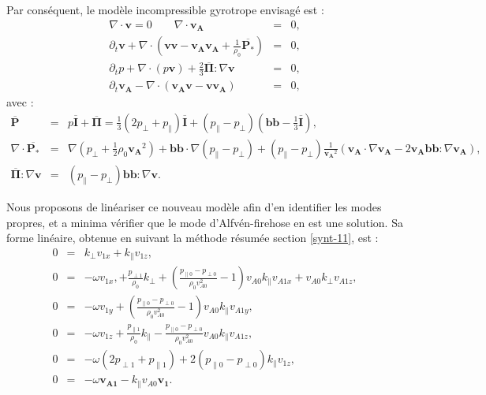 Par conséquent, le modèle incompressible gyrotrope envisagé est : 
\begin{eqnarray}
\label{eq:model_cpginc_r} \nabla \cdot \boldsymbol{v} = 0  \qquad \nabla \cdot \boldsymbol{v_A} &=& 0,\\
\label{eq:model_cpginc_v} \partial_t  \boldsymbol{v} + \nabla \cdot (\boldsymbol{v}\boldsymbol{v} - \boldsymbol{v_A}\boldsymbol{v_A} + \frac{1}{\rho_0} \overline{\boldsymbol{P_*}})  &=& 0 , \\
\label{eq:model_cpginc_p} \partial_t p + \nabla \cdot (p \boldsymbol{v} ) + \frac{2}{3} \overline{\boldsymbol{\Pi}} : \nabla \boldsymbol{v}   &=& 0  , \\
\label{eq:model_cpginc_b} \partial_t \boldsymbol{v_A} -  \nabla \cdot (\boldsymbol{v_A}\boldsymbol{v} - \boldsymbol{v}\boldsymbol{v_A}) &=& 0 ,
\end{eqnarray}
avec :
\begin{eqnarray*} 
\overline{\boldsymbol{P}} &=& p \overline{\boldsymbol{I}} +  \overline{\boldsymbol{\Pi}} =\frac{1}{3} (2 p_{\perp} + p_{\parallel} )\overline{\boldsymbol{I}} + (p_{\parallel} - p_{\perp})(\boldsymbol{b}\boldsymbol{b} - \frac{1}{3} \overline{\boldsymbol{I}} ) ,\\
 \nabla \cdot \overline{\boldsymbol{P_*}} &=& \nabla (p_{\perp}+\frac{1}{2} \rho_0\boldsymbol{v_A}^2) + \boldsymbol{b}\boldsymbol{b} \cdot \nabla (p_{\parallel}-p_{\perp}) + (p_{\parallel}-p_{\perp})\frac{1}{\boldsymbol{v_A}^2} (\boldsymbol{v_A} \cdot \nabla \boldsymbol{v_A} - 2 \boldsymbol{v_A}\boldsymbol{b}\boldsymbol{b}:\nabla \boldsymbol{v_A}),\\
 \overline{\boldsymbol{\Pi}} : \nabla \boldsymbol{v} &=& (p_{\parallel} - p_{\perp})\boldsymbol{b}\boldsymbol{b}: \nabla \boldsymbol{v}.
\end{eqnarray*}

Nous proposons de linéariser ce nouveau modèle afin d'en identifier les modes propres, et a minima vérifier que le mode d'Alfvén-firehose en est une solution. Sa forme linéaire, obtenue en suivant la méthode résumée section \ref{synt-11}, est : 
\begin{eqnarray}
\label{eq:lin_cpginc_r}0&=& k_{\perp} v_{1x} + k_{\parallel} v_{1z},\\
\label{eq:lin_cpginc_vx} 0&=&-\omega  v_{1x} ,
+  \frac{p_{\perp 1}}{\rho_0} k_{\perp}   
 + (\frac{p_{\parallel 0}-p_{\perp 0}}{\rho_0 v_{A0}^2}-1) v_{A0}k_{\parallel}v_{A1x}+  v_{A0}  k_{\perp} v_{A1z},\\
 \label{eq:lin_cpginc_vy} 0&=&-\omega  v_{1y}   + (\frac{p_{\parallel 0}-p_{\perp 0}}{\rho_0 v_{A0}^2}-1) v_{A0}k_{\parallel}v_{A1y} ,
 \\
\label{eq:lin_cpginc_vz} 0&=&-\omega  v_{1z}
+ \frac{p_{\parallel 1}}{\rho_0}k_{\parallel} 
 -  \frac{p_{\parallel 0}-p_{\perp 0}}{\rho_0 v_{A0}^2} v_{A0}  k_{\parallel} v_{A1z}, \\
\label{eq:lin_cpginc_p}0&=& -\omega  (2p_{\perp 1}+ p_{\parallel 1})   + 2 (p_{\parallel 0} - p_{\perp 0}) k_{\parallel}v_{1z}    , \\
\label{eq:lin_cpginc_b}0&=& -\omega  \boldsymbol{v_{A1}} -   k_{\parallel} v_{A0}\boldsymbol{v_1}  .
\end{eqnarray}

